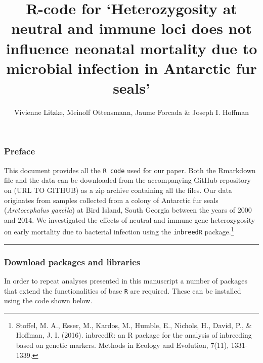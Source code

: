 \documentclass[]{article}
\title{R-code for `Heterozygosity at neutral and immune loci does not influence
neonatal mortality due to microbial infection in Antarctic fur seals'}
\author{Vivienne Litzke, Meinolf Ottensmann, Jaume Forcada \& Joseph I. Hoffman}
\date{}
\let\rmarkdownfootnote\footnote%
\def\footnote{\protect\rmarkdownfootnote}
\begin{document}
\maketitle

\subsubsection{Preface}\label{preface}

This document provides all the \texttt{R\ code} used for our paper. Both
the Rmarkdown file and the data can be downloaded from the accompanying
GitHub repository on (URL TO GITHUB) as a zip archive containing all the
files. Our data originates from samples collected from a colony of
Antarctic fur seals (\emph{Arctocephalus gazella}) at Bird Island, South
Georgia between the years of 2000 and 2014. We investigated the effects
of neutral and immune gene heterozygosity on early mortality due to
bacterial infection using the \texttt{inbreedR} package.\footnote{Stoffel,
  M. A., Esser, M., Kardos, M., Humble, E., Nichols, H., David, P., \&
  Hoffman, J. I. (2016). inbreedR: an R package for the analysis of
  inbreeding based on genetic markers. Methods in Ecology and Evolution,
  7(11), 1331-1339.}

\begin{center}\rule{0.5\linewidth}{\linethickness}\end{center}

\subsubsection{Download packages and
libraries}\label{download-packages-and-libraries}

In order to repeat analyses presented in this manuscript a number of
packages that extend the functionalities of base \texttt{R} are
required. These can be installed using the code shown below.
\end{document}
